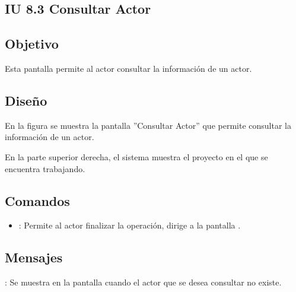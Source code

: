 \subsection{IU 8.3 Consultar Actor}

\subsection{Objetivo}
	Esta pantalla permite al actor consultar la información de un actor.
\subsection{Diseño}
	En la figura  se muestra la pantalla ''Consultar Actor'' que permite consultar la información de un actor.
	
	En la parte superior derecha, el sistema muestra el proyecto en el que se encuentra trabajando.

\subsection{Comandos}
\begin{itemize}
	\item {}: Permite al actor finalizar la operación, dirige a la pantalla .
\end{itemize}

\subsection{Mensajes}

\begin{Citemize}
	\item {}: Se muestra en la pantalla  cuando el actor que se desea consultar no existe.
\end{Citemize}
